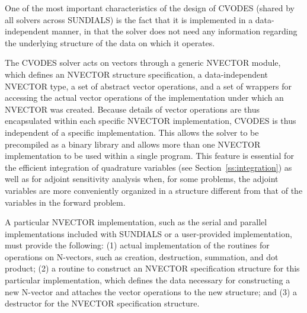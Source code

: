 One of the most important characteristics of the design of CVODES 
(shared by all solvers across SUNDIALS) is the fact that it is implemented 
in a data-independent manner, in that the solver does not need any information
regarding the underlying structure of the data on which it operates.

The CVODES solver acts on vectors through a generic NVECTOR module,
which defines an NVECTOR structure specification, a data-independent NVECTOR type, 
a set of abstract vector operations, and a set of wrappers for accessing the actual vector
operations of the implementation under which an NVECTOR was created. Because
details of vector operations are thus encapsulated within each specific
NVECTOR implementation, CVODES is thus independent of a specific
implementation. This allows the solver to be precompiled as a binary
library and allows more than one NVECTOR implementation to be used within
a single program. This feature is essential for the efficient integration of
quadrature variables (see Section~\ref{ss:integration}) as well as for
adjoint sensitivity analysis when, for some problems, the adjoint variables
are more conveniently organized in a structure different from that of
the variables in the forward problem.

A particular NVECTOR implementation, such as the serial and parallel 
implementations included with SUNDIALS or a user-provided implementation,
must provide the following:
(1) actual implementation of the routines for operations on N-vectors, 
such as creation, destruction, summation, and dot product;
(2) a routine to construct an NVECTOR specification structure
for this particular implementation, which defines the data necessary
for constructing a new N-vector and attaches the vector operations
to the new structure; and
(3) a destructor for the NVECTOR specification structure.

